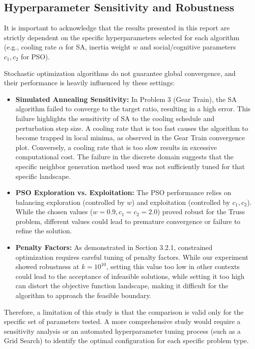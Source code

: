 \subsection{Hyperparameter Sensitivity and Robustness}

It is important to acknowledge that the results presented in this report are strictly dependent on the specific hyperparameters selected for each algorithm (e.g., cooling rate $\alpha$ for SA, inertia weight $w$ and social/cognitive parameters $c_1, c_2$ for PSO).

Stochastic optimization algorithms do not guarantee global convergence, and their performance is heavily influenced by these settings:

\begin{itemize}
    \item \textbf{Simulated Annealing Sensitivity:} In Problem 3 (Gear Train), the SA algorithm failed to converge to the target ratio, resulting in a high error. This failure highlights the sensitivity of SA to the cooling schedule and perturbation step size. A cooling rate that is too fast causes the algorithm to become trapped in local minima, as observed in the Gear Train convergence plot. Conversely, a cooling rate that is too slow results in excessive computational cost. The failure in the discrete domain suggests that the specific neighbor generation method used was not sufficiently tuned for that specific landscape.

    \item \textbf{PSO Exploration vs. Exploitation:} The PSO performance relies on balancing exploration (controlled by $w$) and exploitation (controlled by $c_1, c_2$). While the chosen values ($w=0.9, c_1=c_2=2.0$) proved robust for the Truss problem, different values could lead to premature convergence or failure to refine the solution.

    \item \textbf{Penalty Factors:} As demonstrated in Section 3.2.1, constrained optimization requires careful tuning of penalty factors. While our experiment showed robustness at $k=10^{10}$, setting this value too low in other contexts could lead to the acceptance of infeasible solutions, while setting it too high can distort the objective function landscape, making it difficult for the algorithm to approach the feasible boundary.
\end{itemize}

Therefore, a limitation of this study is that the comparison is valid only for the specific set of parameters tested. A more comprehensive study would require a sensitivity analysis or an automated hyperparameter tuning process (such as a Grid Search) to identify the optimal configuration for each specific problem type.
